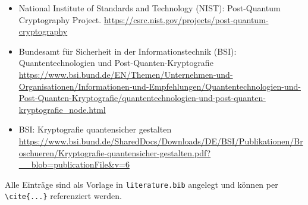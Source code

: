 \documentclass[a4paper,11pt]{article}
\begin{document}
\begin{itemize}
	\item National Institute of Standards and Technology (NIST): Post-Quantum
	      Cryptography Project. \url{https://csrc.nist.gov/projects/post-quantum-cryptography}

	\item Bundesamt für Sicherheit in der Informationstechnik (BSI):
	      Quantentechnologien und Post-Quanten-Kryptografie \\
	      \url{https://www.bsi.bund.de/EN/Themen/Unternehmen-und-Organisationen/Informationen-und-Empfehlungen/Quantentechnologien-und-Post-Quanten-Kryptografie/quantentechnologien-und-post-quanten-kryptografie_node.html}

	\item BSI: Kryptografie quantensicher gestalten \\
	      \url{https://www.bsi.bund.de/SharedDocs/Downloads/DE/BSI/Publikationen/Broschueren/Kryptografie-quantensicher-gestalten.pdf?__blob=publicationFile&v=6}
\end{itemize}
Alle Einträge sind als Vorlage in \texttt{literature.bib} angelegt und können
per \verb|\cite{...}| referenziert werden.
\end{document}
